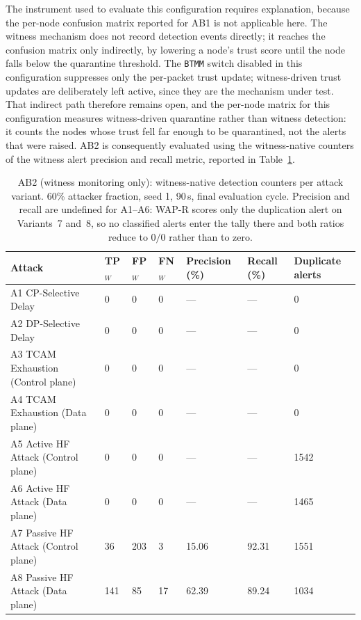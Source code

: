 \documentclass[12pt, a4paper]{report}
\begin{document}
{{The instrument used to evaluate this configuration requires
explanation, because the per-node confusion matrix reported for
AB1 is not applicable here. The witness mechanism does not record
detection events directly; it reaches the confusion matrix only
indirectly, by lowering a node's trust score until the node
falls below the quarantine threshold. The \texttt{BTMM} switch
disabled in this configuration suppresses only the per-packet
trust update; witness-driven trust updates are deliberately left
active, since they are the mechanism under test. That indirect
path therefore remains open, and the per-node matrix for this
configuration measures witness-driven quarantine rather than
witness detection: it counts the nodes whose trust fell far
enough to be quarantined, not the alerts that were raised. AB2 is
consequently
evaluated using the witness-native counters of the witness
alert precision and recall metric, reported in
Table~\ref{tab:q4_witness}.

\begin{table}[H]
\centering
\caption{AB2 (witness monitoring only): witness-native detection
counters per attack variant. 60\% attacker fraction, seed 1,
90\,s, final evaluation cycle. Precision and recall are
undefined for A1--A6: WAP-R scores only the duplication alert on
Variants~7 and~8, so no classified alerts enter the tally there
and both ratios reduce to $0/0$ rather than to zero.}
\label{tab:q4_witness}
\renewcommand{\arraystretch}{1.1}
\footnotesize
\begin{tabular}{|p{3.9cm}|p{1.0cm}|p{1.0cm}|p{1.0cm}|p{1.6cm}|p{1.4cm}|p{1.5cm}|}
\hline
\textbf{Attack} & \textbf{TP$_W$} & \textbf{FP$_W$} &
\textbf{FN$_W$} & \textbf{Precision (\%)} & \textbf{Recall
(\%)} & \textbf{Duplicate alerts} \\
\hline
A1 CP-Selective Delay & 0 & 0 & 0 & --- & --- & 0 \\
\hline
A2 DP-Selective Delay & 0 & 0 & 0 & --- & --- & 0 \\
\hline
A3 TCAM Exhaustion (Control plane) & 0 & 0 & 0 & --- & --- & 0 \\
\hline
A4 TCAM Exhaustion (Data plane) & 0 & 0 & 0 & --- & --- & 0 \\
\hline
A5 Active HF Attack (Control plane) & 0 & 0 & 0 & --- & --- & 1542 \\
\hline
A6 Active HF Attack (Data plane) & 0 & 0 & 0 & --- & --- & 1465 \\
\hline
A7 Passive HF Attack (Control plane) & 36 & 203 & 3 & 15.06 & 92.31 & 1551 \\
\hline
A8 Passive HF Attack (Data plane) & 141 & 85 & 17 & 62.39 & 89.24 & 1034 \\
\hline
\end{tabular}
\end{table}

}}
\end{document}

